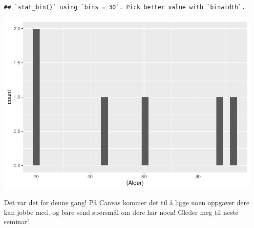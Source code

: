 \documentclass[
]{article}
\begin{document}
\begin{verbatim}
## `stat_bin()` using `bins = 30`. Pick better value with `binwidth`.
\end{verbatim}

\includegraphics{Seminar_1_files/figure-latex/unnamed-chunk-16-1.pdf}

Det var det for denne gang! På Canvas kommer det til å ligge noen
oppgaver dere kan jobbe med, og bare send spørsmål om dere har noen!
Gleder meg til neste seminar!
\end{document}
